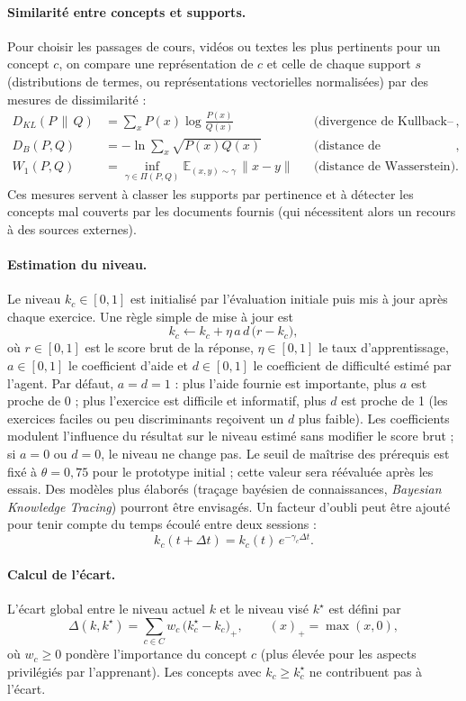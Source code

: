 \documentclass[11pt,a4paper]{article}
\begin{document}
\paragraph{Similarité entre concepts et supports.}
Pour choisir les passages de cours, vidéos ou textes les plus pertinents pour un concept $c$, on compare une représentation de $c$ et celle de chaque support $s$ (distributions de termes, ou représentations vectorielles normalisées) par des mesures de dissimilarité :
\begin{align*}
D_{KL}(P\,\|\,Q) &= \sum_x P(x)\log\frac{P(x)}{Q(x)}
&&\text{(divergence de Kullback--Leibler)},\\
D_B(P,Q) &= -\ln\sum_x\sqrt{P(x)Q(x)}
&&\text{(distance de Bhattacharyya)},\\
W_1(P,Q) &= \inf_{\gamma\in\Pi(P,Q)}\mathbb{E}_{(x,y)\sim\gamma}\,\|x-y\|
&&\text{(distance de Wasserstein)}.
\end{align*}
Ces mesures servent à classer les supports par pertinence et à détecter les concepts mal couverts par les documents fournis (qui nécessitent alors un recours à des sources externes).

\paragraph{Estimation du niveau.}
Le niveau $k_c\in[0,1]$ est initialisé par l'évaluation initiale puis mis à jour après chaque exercice. Une règle simple de mise à jour est
\[
k_c \leftarrow k_c + \eta\,a\,d\,\bigl(r - k_c\bigr),
\]
où $r\in[0,1]$ est le score brut de la réponse, $\eta\in[0,1]$ le taux d'apprentissage, $a\in[0,1]$ le coefficient d'aide et $d\in[0,1]$ le coefficient de difficulté estimé par l'agent. Par défaut, $a=d=1$ : plus l'aide fournie est importante, plus $a$ est proche de 0 ; plus l'exercice est difficile et informatif, plus $d$ est proche de 1 (les exercices faciles ou peu discriminants reçoivent un $d$ plus faible). Les coefficients modulent l'influence du résultat sur le niveau estimé sans modifier le score brut ; si $a=0$ ou $d=0$, le niveau ne change pas. Le seuil de maîtrise des prérequis est fixé à $\theta=0{,}75$ pour le prototype initial ; cette valeur sera réévaluée après les essais. Des modèles plus élaborés (traçage bayésien de connaissances, \textit{Bayesian Knowledge Tracing}) pourront être envisagés. Un facteur d'oubli peut être ajouté pour tenir compte du temps écoulé entre deux sessions :
\[
k_c(t+\Delta t) = k_c(t)\,e^{-\gamma_c\Delta t}.
\]

\paragraph{Calcul de l'écart.}
L'écart global entre le niveau actuel $k$ et le niveau visé $k^\star$ est défini par
\[
\Delta(k,k^\star) = \sum_{c\in C} w_c\,\bigl(k^\star_c - k_c\bigr)_+ ,
\qquad (x)_+=\max(x,0),
\]
où $w_c\ge 0$ pondère l'importance du concept $c$ (plus élevée pour les aspects privilégiés par l'apprenant). Les concepts avec $k_c\ge k^\star_c$ ne contribuent pas à l'écart.
\end{document}
